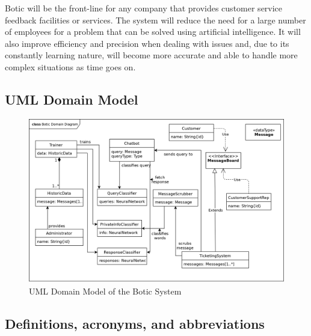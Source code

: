 \documentclass[11pt]{article}
\begin{document}
Botic will be the front-line for any company that provides customer service feedback facilities or services. The system will reduce the need for a large number of employees for a problem that can be solved using artificial intelligence. It will also improve efficiency and precision when dealing with issues and, due to its constantly learning nature, will become more accurate and able to handle more complex situations as time goes on.

\subsection{UML Domain Model}

\begin{figure}[H]
	\centering
 	\includegraphics[width=1.0\textwidth]{../../images/Botic_Domain_Diagram.png}
	\caption{UML Domain Model of the Botic System}
\end{figure}

\subsection{Definitions, acronyms, and abbreviations}
\end{document}
